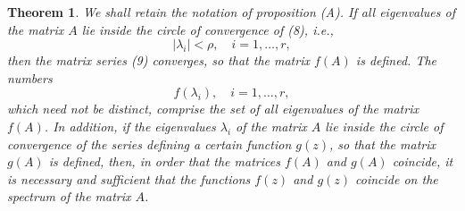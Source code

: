 \documentclass[10pt,a5paper]{book}
\theoremstyle{plain}
\newtheorem{theorem}{Theorem}
\theoremstyle{definition}
\theoremstyle{remark}
\begin{document}
\begin{theorem}
We shall retain the notation of proposition (A). If all eigenvalues of the matrix $A$ lie inside the circle of convergence of (8), i.e.,
\[
\left|\lambda_{i}\right|<\rho, \quad i=1, \ldots, r,
\]
then the matrix series (9) converges, so that the matrix $f(A)$ is defined. The numbers
\begin{equation*}
f\left(\lambda_{i}\right), \quad i=1, \ldots, r, \tag{10}
\end{equation*}
which need not be distinct, comprise the set of all eigenvalues of the matrix $f(A)$. In addition, if the eigenvalues $\lambda_{i}$ of the matrix $A$ lie inside the circle of convergence of the series defining a certain function $g(z)$, so that the matrix $g(A)$ is defined, then, in order that the matrices $f(A)$ and $g(A)$ coincide, it is necessary and sufficient that the functions $f(z)$ and $g(z)$ coincide on the spectrum of the matrix $A$.
\end{theorem}
\end{document}
